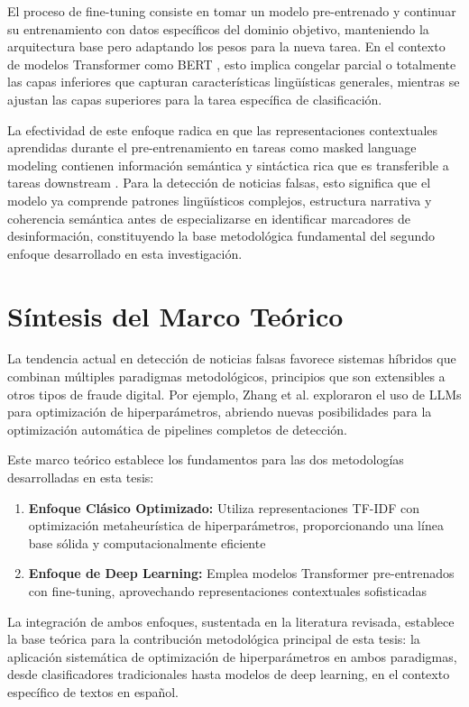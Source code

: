 El proceso de fine-tuning consiste en tomar un modelo pre-entrenado y continuar su entrenamiento con datos específicos del dominio objetivo, manteniendo la arquitectura base pero adaptando los pesos para la nueva tarea. En el contexto de modelos Transformer como BERT \cite{kenton2019bert}, esto implica congelar parcial o totalmente las capas inferiores que capturan características lingüísticas generales, mientras se ajustan las capas superiores para la tarea específica de clasificación.

La efectividad de este enfoque radica en que las representaciones contextuales aprendidas durante el pre-entrenamiento en tareas como masked language modeling contienen información semántica y sintáctica rica que es transferible a tareas downstream \cite{ruder2019neural}. Para la detección de noticias falsas, esto significa que el modelo ya comprende patrones lingüísticos complejos, estructura narrativa y coherencia semántica antes de especializarse en identificar marcadores de desinformación, constituyendo la base metodológica fundamental del segundo enfoque desarrollado en esta investigación.

\section{Síntesis del Marco Teórico}
\label{sec:sintesis_marco}

La tendencia actual en detección de noticias falsas favorece sistemas híbridos que combinan múltiples paradigmas metodológicos, principios que son extensibles a otros tipos de fraude digital. Por ejemplo, Zhang et al. \cite{zhang2023using} exploraron el uso de LLMs para optimización de hiperparámetros, abriendo nuevas posibilidades para la optimización automática de pipelines completos de detección.

Este marco teórico establece los fundamentos para las dos metodologías desarrolladas en esta tesis:

\begin{enumerate}
    \item \textbf{Enfoque Clásico Optimizado:} Utiliza representaciones TF-IDF con optimización metaheurística de hiperparámetros, proporcionando una línea base sólida y computacionalmente eficiente
    
    \item \textbf{Enfoque de Deep Learning:} Emplea modelos Transformer pre-entrenados con fine-tuning, aprovechando representaciones contextuales sofisticadas
\end{enumerate}

La integración de ambos enfoques, sustentada en la literatura revisada, establece la base teórica para la contribución metodológica principal de esta tesis: la aplicación sistemática de optimización de hiperparámetros en ambos paradigmas, desde clasificadores tradicionales hasta modelos de deep learning, en el contexto específico de textos en español.